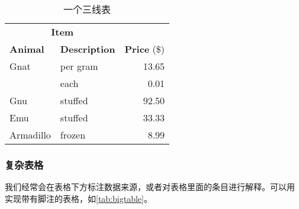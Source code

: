 \begin{table}[!hpt]
    \caption{一个三线表}
    \label{tab:firstone}
    \centering
    \begin{tabular}{@{}llr@{}} \toprule
        \multicolumn{2}{c}{\textbf{Item}}                            \\ \cmidrule(r){1-2}
        \textbf{Animal} & \textbf{Description} & \textbf{Price} (\$) \\ \midrule
        Gnat            & per gram             & 13.65               \\
                        & each                 & 0.01                \\
        Gnu             & stuffed              & 92.50               \\
        Emu             & stuffed              & 33.33               \\
        Armadillo       & frozen               & 8.99                \\ \bottomrule
    \end{tabular}
\end{table}

\subsubsection{复杂表格}

我们经常会在表格下方标注数据来源，或者对表格里面的条目进行解释。可以用  实现带有脚注的表格，如\cref{tab:bigtable}。

